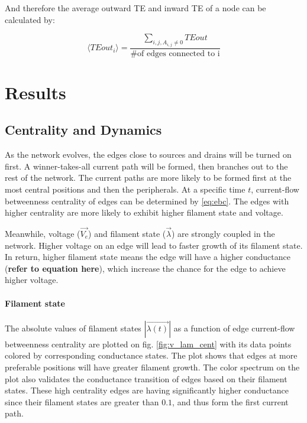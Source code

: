 \documentclass[%
 reprint,
 amsmath,amssymb,
 aps,
]{revtex4-2}
\begin{document}
And therefore the average outward TE and inward TE of a node can be calculated by:

\begin{equation}
\langle TEout_i \rangle = \frac{\sum \limits_{i,j, A_{i,j} \neq 0} TEout}{\text{\# of edges connected to i}}
\end{equation}

\section{\label{sec:level1} Results }

\subsection{\label{sec:level2} Centrality and Dynamics}

As the network evolves, the edges close to sources and drains will be turned on first. A winner-takes-all current path will be formed, then branches out to the rest of the network. The current paths are more likely to be formed first at the most central positions and then the peripherals. At a specific time $t$, current-flow betweenness centrality of edges can be determined by \ref{eq:ebc}. The edges with higher centrality are more likely to exhibit higher filament state and voltage.

Meanwhile, voltage ($\vec{V_e}$) and filament state ($\vec{\lambda}$) are strongly coupled in the network. Higher voltage on an edge will lead to faster growth of its filament state. In return, higher filament state  means the edge will have a higher conductance (\textbf{refer to equation here}), which increase the chance for the edge to achieve higher voltage.


\paragraph{Filament state}

The absolute values of filament states $|\vec{\lambda (t)}|$ as a function of edge current-flow betweenness centrality are plotted on fig. \ref{fig:v_lam_cent} with its data points colored by corresponding conductance states. The plot shows that edges at more preferable positions will have greater filament growth. The color spectrum on the plot also validates the conductance transition of edges based on their filament states. These high centrality edges are having significantly higher conductance since their filament states are greater than $0.1$, and thus form the first current path.
\end{document}
